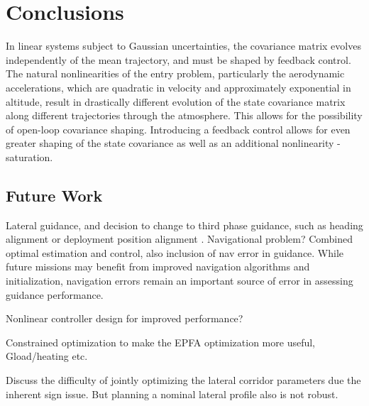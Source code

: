\chapter{Conclusions}

In linear systems subject to Gaussian uncertainties, the covariance matrix evolves independently of the mean trajectory, and must be shaped by feedback control. The natural nonlinearities of the entry problem, particularly the aerodynamic accelerations, which are quadratic in velocity and approximately exponential in altitude, result in drastically different evolution of the state covariance matrix along different trajectories through the atmosphere. This allows for the possibility of open-loop covariance shaping. Introducing a feedback control allows for even greater shaping of the state covariance as well as an additional nonlinearity - saturation. 

\section{Future Work}
Lateral guidance, and decision to change to third phase guidance, such as heading alignment or deployment position alignment \cite{GuangfeiDissertation}.
Navigational problem? Combined optimal estimation and control, also inclusion of nav error in guidance. While future missions may benefit from improved navigation algorithms and initialization, navigation errors remain an important source of error in assessing guidance performance. 

Nonlinear controller design for improved performance? 

Constrained optimization to make the EPFA optimization more useful, Gload/heating etc. 

Discuss the difficulty of jointly optimizing the lateral corridor parameters due the inherent sign issue. But planning a nominal lateral profile also is not robust.


